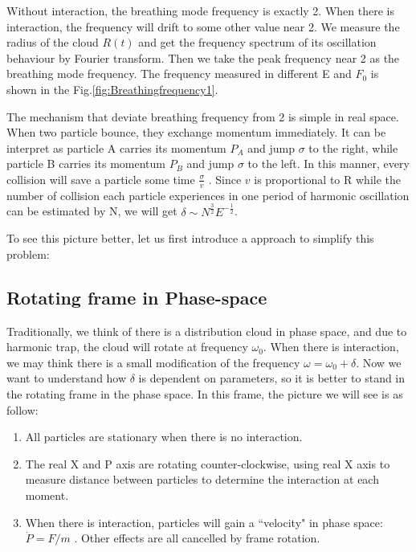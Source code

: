 \documentclass[aps,pre,twocolumn
,groupedaddress]{revtex4-1}
\begin{document}
Without interaction, the breathing mode frequency is exactly 2. When there is interaction, the frequency will drift to some other value near 2. We measure the radius of the cloud $R(t)$ and get the frequency spectrum of its oscillation behaviour by Fourier transform. Then we take the peak frequency near 2 as the breathing mode frequency. The frequency measured in different E and $F_0$ is shown in the Fig.\ref{fig:Breathingfrequency1}.

The mechanism that deviate breathing frequency from 2 is simple in real space. When two particle bounce, they exchange momentum immediately. It can be interpret as particle A carries its momentum $P_A$ and jump $\sigma$ to the right, while particle B carries its momentum $P_B$ and jump $\sigma$ to the left. In this manner, every collision will save a particle some time $\frac{\sigma}{v}$ . Since $v$ is proportional to R while the number of collision each particle experiences in one period of harmonic oscillation can be estimated by N, we will get $\delta\sim N^{\frac{3}{2}}E^{-\frac{1}{2}}$. 

To see this picture better, let us first introduce a approach to simplify this problem:

\subsection{Rotating frame in Phase-space}
Traditionally, we think of there is a distribution cloud in phase space, and due to harmonic trap, the cloud will rotate at frequency $\omega_0$. When there is interaction, we may think there is a small modification of the frequency $\omega=\omega_0+\delta$. Now we want to understand how $\delta$ is dependent on parameters, so it is better to stand in the rotating frame in the phase space. In this frame, the picture we will see is as follow:\\
\begin{enumerate}[\textbf{*}]
\item All particles are stationary when there is no interaction.
\item The real X and P axis are rotating counter-clockwise, using real X axis to measure distance between particles to determine the interaction at each moment.
\item When there is interaction, particles will gain a ``velocity" in phase space: $\dot{P}=F/m$ . Other effects are all cancelled by frame rotation.
\end{enumerate}
\end{document}
